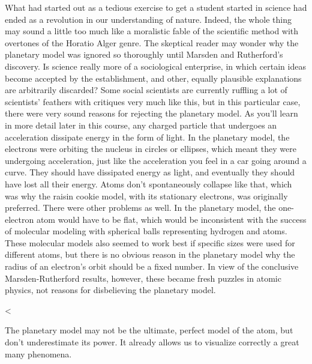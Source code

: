         What had started out as a tedious exercise to get a student
        started in science had ended as a revolution in our
        understanding of nature. Indeed, the whole thing may sound a
        little too much like a moralistic fable of the scientific
        method with overtones of the Horatio Alger genre. The
        skeptical reader may wonder why the planetary model was
        ignored so thoroughly until Marsden and Rutherford's
        discovery. Is science really more of a sociological
        enterprise, in which certain ideas become accepted by the
        establishment, and other, equally plausible explanations are
        arbitrarily discarded? Some social scientists are currently
        ruffling a lot of scientists' feathers with critiques very
        much like this, but in this particular case, there were very
        sound reasons for rejecting the planetary model. As you'll
        learn in more detail later in this course, any charged
        particle that undergoes an acceleration dissipate energy in
        the form of light. In the planetary model, the electrons
        were orbiting the nucleus in circles or ellipses, which
        meant they were undergoing acceleration, just like the
        acceleration you feel in a car going around a curve. They
        should have dissipated energy as light, and eventually they
        should have lost all their energy. Atoms don't spontaneously
        collapse like that, which was why the raisin cookie model,
        with its stationary electrons, was originally preferred.
        There were other problems as well. In the planetary model,
        the one-electron atom would have to be flat, which would be
        inconsistent with the success of molecular modeling with
        spherical balls representing hydrogen and atoms. These
        molecular models also seemed to work best if specific sizes
        were used for different atoms, but there is no obvious
        reason in the planetary model why the radius of an
        electron's orbit should be a fixed number. In view of the
        conclusive Marsden-Rutherford results, however, these became
        fresh puzzles in atomic physics, not reasons for disbelieving
        the planetary model.

    <%

        The planetary model may not be the ultimate, perfect model
        of the atom, but don't underestimate its power. It already
        allows us to visualize correctly a great many phenomena.

